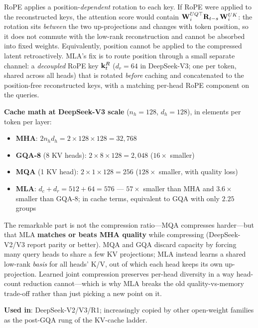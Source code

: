 \begin{keyinsight}
RoPE applies a position-\textit{dependent} rotation to each key. If RoPE were applied to the reconstructed keys, the attention score would contain $\mathbf{W}_i^{UQ\top} \mathbf{R}_{t-s}\, \mathbf{W}_i^{UK}$: the rotation sits \textit{between} the two up-projections and changes with token position, so it does not commute with the low-rank reconstruction and cannot be absorbed into fixed weights. Equivalently, position cannot be applied to the compressed latent retroactively. MLA's fix is to route position through a small separate channel: a \textit{decoupled} RoPE key $\mathbf{k}_t^{R}$ ($d_r = 64$ in DeepSeek-V3; one per token, shared across all heads) that is rotated \textit{before} caching and concatenated to the position-free reconstructed keys, with a matching per-head RoPE component on the queries.
\end{keyinsight}

\textbf{Cache math at DeepSeek-V3 scale} ($n_h = 128$, $d_h = 128$), in elements per token per layer:
\begin{itemize}
    \item \textbf{MHA}: $2 n_h d_h = 2 \times 128 \times 128 = 32{,}768$
    \item \textbf{GQA-8} (8 KV heads): $2 \times 8 \times 128 = 2{,}048$ ($16\times$ smaller)
    \item \textbf{MQA} (1 KV head): $2 \times 1 \times 128 = 256$ ($128\times$ smaller, with quality loss)
    \item \textbf{MLA}: $d_c + d_r = 512 + 64 = 576$ --- $57\times$ smaller than MHA and $3.6\times$ smaller than GQA-8; in cache terms, equivalent to GQA with only $2.25$ groups
\end{itemize}

The remarkable part is not the compression ratio---MQA compresses harder---but that MLA \textbf{matches or beats MHA quality} while compressing (DeepSeek-V2/V3 report parity or better). MQA and GQA discard capacity by forcing many query heads to share a few KV projections; MLA instead learns a shared low-rank \textit{basis} for all heads' K/V, out of which each head keeps its own up-projection. Learned joint compression preserves per-head diversity in a way head-count reduction cannot---which is why MLA breaks the old quality-vs-memory trade-off rather than just picking a new point on it.

\textbf{Used in}: DeepSeek-V2/V3/R1; increasingly copied by other open-weight families as the post-GQA rung of the KV-cache ladder.

